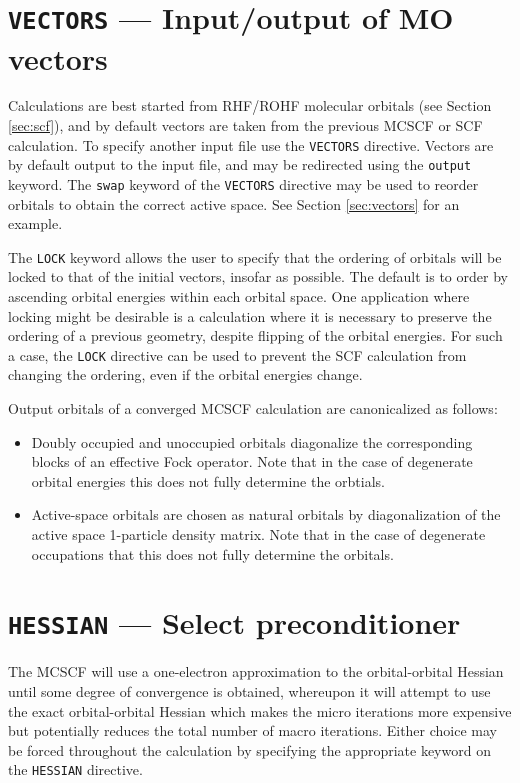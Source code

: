 \section{{\tt VECTORS} --- Input/output of MO vectors}
\label{sec:mcscfvectors}

Calculations are best started from RHF/ROHF molecular orbitals (see
Section \ref{sec:scf}), and by default vectors are taken from the
previous MCSCF or SCF calculation.  To specify another input file use
the \verb+VECTORS+ directive.  Vectors are by default output to the
input file, and may be redirected using the \verb+output+ keyword.
The \verb+swap+ keyword of the \verb+VECTORS+ directive may be
used to reorder orbitals to obtain the correct active space.
See Section \ref{sec:vectors} for an example.

The \verb+LOCK+ keyword allows the user to specify that the ordering
of orbitals will be locked to that of the initial vectors, insofar as
possible. The default is to order by ascending orbital energies within
each orbital space. One application where locking might be desirable
is a calculation where it is necessary to preserve the ordering of a
previous geometry, despite flipping of the orbital energies.  For such
a case, the \verb+LOCK+ directive can be used to prevent the SCF
calculation from changing the ordering, even if the orbital energies
change.

Output orbitals of a converged MCSCF calculation are canonicalized as
follows:
\begin{itemize}
\item Doubly occupied and unoccupied orbitals diagonalize the
  corresponding blocks of an effective Fock operator.  Note that in
  the case of degenerate orbital energies this does not fully
  determine the orbtials.
\item Active-space orbitals are chosen as natural orbitals by
  diagonalization of the active space 1-particle density matrix.
  Note that in the case of degenerate occupations that this
  does not fully determine the orbitals.
\end{itemize}

\section{{\tt HESSIAN} --- Select preconditioner}
\label{sec:mcscfhessian}

The MCSCF will use a one-electron approximation to the orbital-orbital
Hessian until some degree of convergence is obtained, whereupon it
will attempt to use the exact orbital-orbital Hessian which makes the
micro iterations more expensive but potentially reduces the total
number of macro iterations.  Either choice may be forced throughout
the calculation by specifying the appropriate keyword on the
\verb+HESSIAN+ directive.

